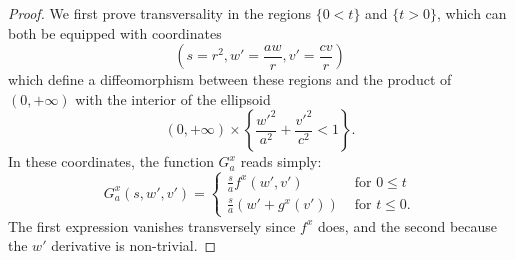 \documentclass[10pt,a4paper]{amsart}
\newcommand{\R}{\mathbf{R}}
\begin{document}
\begin{proof}
We first prove transversality in the regions $\{0 < t\}$ and $\{t > 0\} $, which can both be equipped with coordinates 
\begin{equation} \label{eq:change_coordinates}
    \left(s=r^2,w'=\frac{aw}{r},v'=\frac{cv}{r}\right)
\end{equation}
which define a diffeomorphism between these regions and the product of $(0,+\infty)$ with the interior of the ellipsoid
\begin{equation}
    (0,+\infty)\times \left\{\frac{w'^2}{a^2}+\frac{v'^2}{c^2} < 1\right\}.
\end{equation}
In these coordinates, the function $G^x_a$ reads simply:
\begin{equation} \label{eq:expressing_F_in_half_space}
  G^x_a(s,w',v') =
  \begin{cases}
    \frac{s}{a}f^x(w',v') &   \textrm{ for } 0 \leq t \\
    \frac{s}{a} \left( w' + g^x(v') \right) &  \textrm{ for } t \leq 0 .
  \end{cases}
\end{equation}
The first expression vanishes transversely since $f^x$ does, and the second because the $w'$ derivative is non-trivial.





\end{proof}
\end{document}
